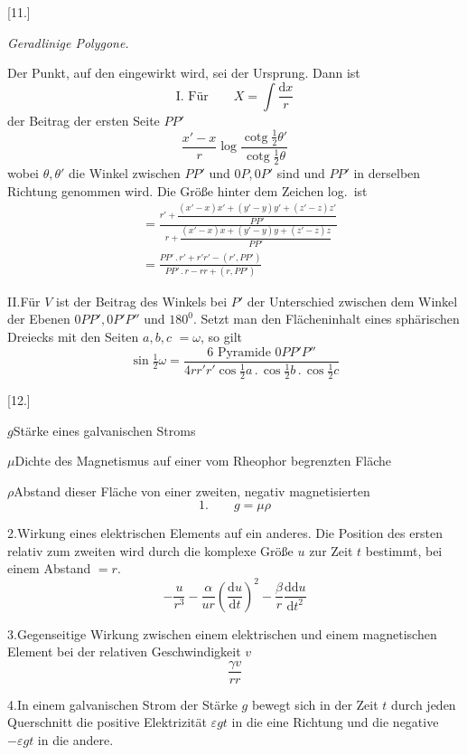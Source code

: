 \begin{center}[11.]\par\medskip\textit{Geradlinige Polygone.}\end{center}
Der Punkt, auf den eingewirkt wird, sei der Ursprung. Dann ist
\[
\text{I. Für}\qquad X=\int\frac{\mathrm dx}{r}
\]
der Beitrag der ersten Seite $PP'$
\[
\frac{x'-x}{r}\log\frac{\operatorname{cotg}\tfrac{1}{2}\theta'}{\operatorname{cotg}\tfrac{1}{2}\theta}
\]
wobei $\theta,\theta'$ die Winkel zwischen $PP'$ und $0P,0P'$ sind und $PP'$ in derselben Richtung genommen wird. Die Größe hinter dem Zeichen log.\ ist
\[
\begin{aligned}
&=\frac{r'+\dfrac{(x'-x)x'+(y'-y)y'+(z'-z)z'}{PP'}}{r+\dfrac{(x'-x)x+(y'-y)y+(z'-z)z}{PP'}}\\[6pt]
&=\frac{PP'\,.\,r'+r'r'-(r',PP')}{PP'\,.\,r-rr+(r,PP')}
\end{aligned}
\]

II.\quad Für $V$ ist der Beitrag des Winkels bei $P'$ der Unterschied zwischen dem Winkel der Ebenen $0PP',0P'P''$ und $180^0$. Setzt man den Flächeninhalt eines sphärischen Dreiecks mit den Seiten $a,b,c$ $=\omega$, so gilt
\[
\sin\tfrac{1}{2}\omega=\frac{6\text{ Pyramide }0PP'P''}{4rr'r'\cos\tfrac{1}{2}a\,.\,\cos\tfrac{1}{2}b\,.\,\cos\tfrac{1}{2}c}
\]
\begin{center}[12.]\end{center}
\noindent$g$\quad Stärke eines galvanischen Stroms\par
\noindent$\mu$\quad Dichte des Magnetismus auf einer vom Rheophor begrenzten Fläche\par
\noindent$\rho$\quad Abstand dieser Fläche von einer zweiten, negativ magnetisierten
\[
\text{1.}\qquad g=\mu\rho
\]

2.\quad Wirkung eines elektrischen Elements auf ein anderes. Die Position des ersten relativ zum zweiten wird durch die komplexe Größe $u$ zur Zeit $t$ bestimmt, bei einem Abstand $=r$.
\[
-\frac{u}{r^3}-\frac{\alpha}{ur}\left(\frac{\mathrm du}{\mathrm dt}\right)^2-\frac{\beta}{r}\frac{\mathrm d\mathrm du}{\mathrm dt^2}
\]

3.\quad Gegenseitige Wirkung zwischen einem elektrischen und einem magnetischen Element bei der relativen Geschwindigkeit $v$
\[
\frac{\gamma v}{rr}
\]

4.\quad In einem galvanischen Strom der Stärke $g$ bewegt sich in der Zeit $t$ durch jeden Querschnitt die positive Elektrizität $\varepsilon gt$ in die eine Richtung und die negative $-\varepsilon gt$ in die andere.

